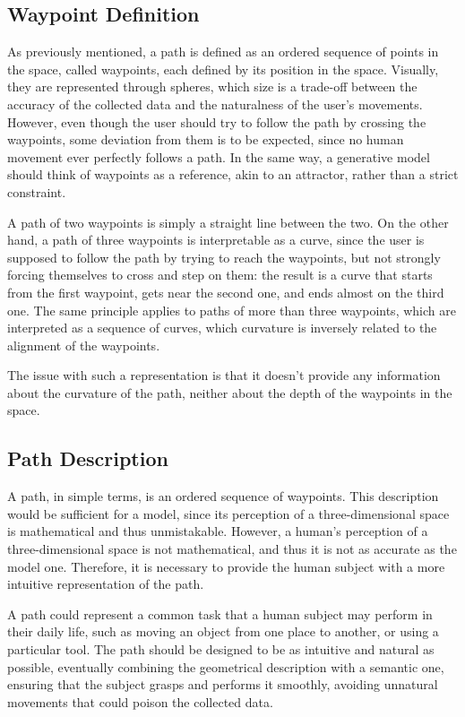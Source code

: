 \documentclass[12pt]{report}
\begin{document}
\subsection{Waypoint Definition}
As previously mentioned, a path is defined as an ordered sequence of points in the space, called waypoints, each defined by its position in the space. Visually, they are represented through spheres, which size is a trade-off between the accuracy of the collected data and the naturalness of the user's movements. However, even though the user should try to follow the path by crossing the waypoints, some deviation from them is to be expected, since no human movement ever perfectly follows a path. In the same way, a generative model should think of waypoints as a reference, akin to an attractor, rather than a strict constraint.

A path of two waypoints is simply a straight line between the two. On the other hand, a path of three waypoints is interpretable as a curve, since the user is supposed to follow the path by trying to reach the waypoints, but not strongly forcing themselves to cross and step on them: the result is a curve that starts from the first waypoint, gets near the second one, and ends almost on the third one. The same principle applies to paths of more than three waypoints, which are interpreted as a sequence of curves, which curvature is inversely related to the alignment of the waypoints.

The issue with such a representation is that it doesn't provide any information about the curvature of the path, neither about the depth of the waypoints in the space. 

\subsection{Path Description}

A path, in simple terms, is an ordered sequence of waypoints. This description would be sufficient for a model, since its perception of a three-dimensional space is mathematical and thus unmistakable. However, a human's perception of a three-dimensional space is not mathematical, and thus it is not as accurate as the model one. Therefore, it is necessary to provide the human subject with a more intuitive representation of the path.

A path could represent a common task that a human subject may perform in their daily life, such as moving an object from one place to another, or using a particular tool. The path should be designed to be as intuitive and natural as possible, eventually combining the geometrical description with a semantic one, ensuring that the subject grasps and performs it smoothly, avoiding unnatural movements that could poison the collected data.
\end{document}
